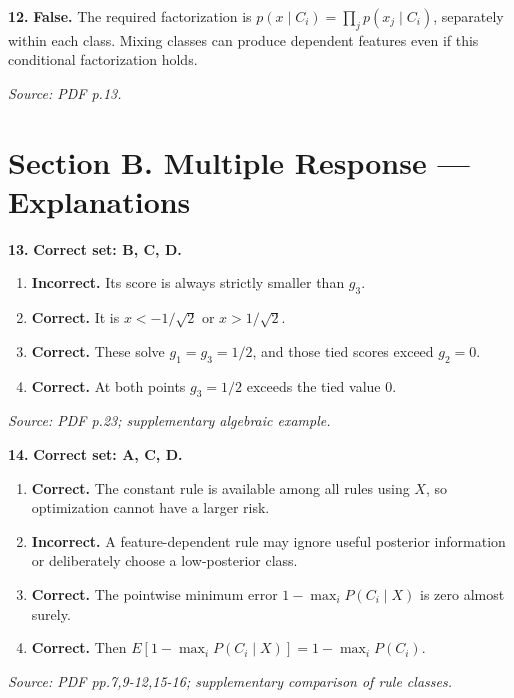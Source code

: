 \documentclass[11pt,a4paper]{article}
\begin{document}
\par\noindent\begin{minipage}{\linewidth}
\textbf{12.} \textbf{False.} The required factorization is \(p(x\mid C_i)=\prod_jp(x_j\mid C_i)\), separately within each class. Mixing classes can produce dependent features even if this conditional factorization holds.

{\footnotesize\textit{Source: PDF p.13.}}
\end{minipage}\par\vspace{3mm}
\newpage\section*{Section B. Multiple Response --- Explanations}
\par\noindent\begin{minipage}{\linewidth}
\textbf{13.} \textbf{Correct set: B, C, D.}
\begin{enumerate}[label=(\Alph*),leftmargin=8mm,itemsep=2pt,topsep=2pt]
\item \textbf{Incorrect.} Its score is always strictly smaller than \(g_3\).
\item \textbf{Correct.} It is \(x<-1/\sqrt2\) or \(x>1/\sqrt2\).
\item \textbf{Correct.} These solve \(g_1=g_3=1/2\), and those tied scores exceed \(g_2=0\).
\item \textbf{Correct.} At both points \(g_3=1/2\) exceeds the tied value 0.
\end{enumerate}
{\footnotesize\textit{Source: PDF p.23; supplementary algebraic example.}}

\end{minipage}\par\vspace{3mm}
\par\noindent\begin{minipage}{\linewidth}
\textbf{14.} \textbf{Correct set: A, C, D.}
\begin{enumerate}[label=(\Alph*),leftmargin=8mm,itemsep=2pt,topsep=2pt]
\item \textbf{Correct.} The constant rule is available among all rules using \(X\), so optimization cannot have a larger risk.
\item \textbf{Incorrect.} A feature-dependent rule may ignore useful posterior information or deliberately choose a low-posterior class.
\item \textbf{Correct.} The pointwise minimum error \(1-\max_iP(C_i\mid X)\) is zero almost surely.
\item \textbf{Correct.} Then \(E[1-\max_iP(C_i\mid X)]=1-\max_iP(C_i)\).
\end{enumerate}
{\footnotesize\textit{Source: PDF pp.7,9-12,15-16; supplementary comparison of rule classes.}}

\end{minipage}\par\vspace{3mm}
\end{document}
